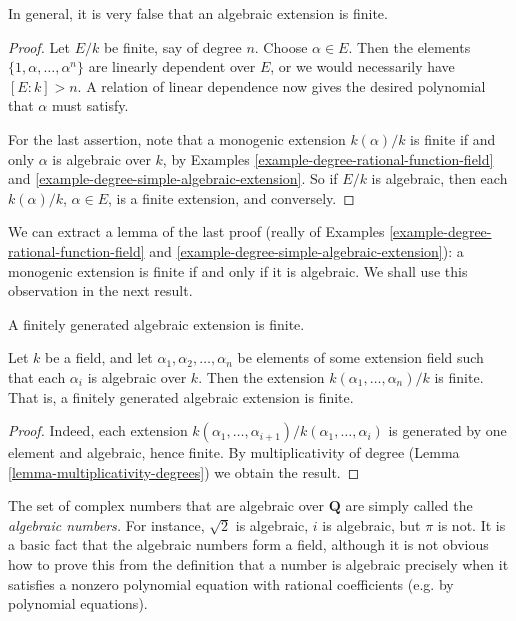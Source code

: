 \noindent
In general, it is very false that an algebraic extension is finite.

\begin{proof}
Let $E/k$ be finite, say of degree $n$. Choose $\alpha \in E$. Then the
elements $\{1, \alpha, \ldots, \alpha^n\}$ are linearly
dependent over $E$, or we would necessarily have $[E : k] > n$. A relation of
linear dependence now gives the desired polynomial that $\alpha$ must satisfy.

\medskip\noindent
For the last assertion, note that a monogenic extension $k(\alpha)/k$ is
finite if and only $\alpha$ is algebraic over $k$, by
Examples \ref{example-degree-rational-function-field} and
\ref{example-degree-simple-algebraic-extension}.
So if $E/k$ is algebraic, then each $k(\alpha)/k$, $\alpha \in E$, is a finite
extension, and conversely.
\end{proof}

\noindent
We can extract a lemma of the last proof (really of
Examples \ref{example-degree-rational-function-field} and
\ref{example-degree-simple-algebraic-extension}):
a monogenic extension is finite if and only if it is algebraic.
We shall use this observation in the next result.

\begin{lemma}
\label{lemma-algebraic-finitely-generated}
\begin{slogan}
A finitely generated algebraic extension is finite.
\end{slogan}
Let $k$ be a field, and let $\alpha_1, \alpha_2, \ldots, \alpha_n$ be elements
of some extension field such that each $\alpha_i$ is algebraic over $k$. Then
the extension $k(\alpha_1, \ldots, \alpha_n)/k$ is finite.
That is, a finitely generated algebraic extension is finite.
\end{lemma}

\begin{proof}
Indeed, each extension
$k(\alpha_{1}, \ldots, \alpha_{i+1})/k(\alpha_1, \ldots, \alpha_{i})$
is generated by one element and algebraic, hence finite.
By multiplicativity of degree (Lemma \ref{lemma-multiplicativity-degrees})
we obtain the result.
\end{proof}

\noindent
The set of complex numbers that are algebraic over $\mathbf{Q}$ are simply
called the {\it algebraic numbers.} For instance, $\sqrt{2}$ is algebraic,
$i$ is algebraic, but $\pi$ is not.
It is a basic fact that the algebraic numbers form a field, although it is not
obvious how to prove this from the definition that a number is algebraic
precisely when it satisfies a nonzero polynomial equation with rational
coefficients (e.g. by polynomial equations).

